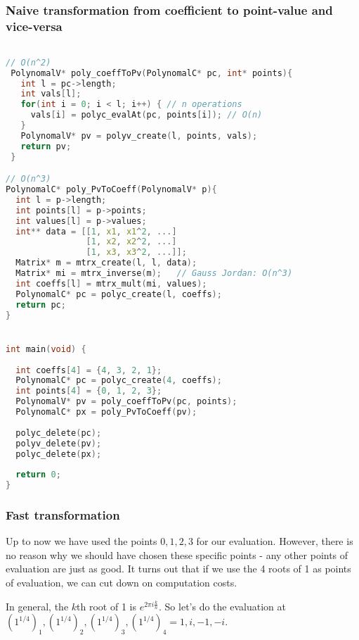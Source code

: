 \subsubsection{Naive transformation from coefficient to point-value and vice-versa}
\begin{lstlisting}[language=c]

// O(n^2)
 PolynomalV* poly_coeffToPv(PolynomalC* pc, int* points){
   int l = pc->length;
   int vals[l];
   for(int i = 0; i < l; i++) { // n operations
     vals[i] = polyc_evalAt(pc, points[i]); // O(n)
   }
   PolynomalV* pv = polyv_create(l, points, vals);
   return pv;
 }

// O(n^3)
PolynomalC* poly_PvToCoeff(PolynomalV* p){
  int l = p->length;
  int points[l] = p->points;
  int values[l] = p->values;
  int** data = [[1, x1, x1^2, ...]
                [1, x2, x2^2, ...]
                [1, x3, x3^2, ...]];
  Matrix* m = mtrx_create(l, l, data);
  Matrix* mi = mtrx_inverse(m);   // Gauss Jordan: O(n^3)
  int coeffs[l] = mtrx_mult(mi, values);
  PolynomalC* pc = polyc_create(l, coeffs);
  return pc;
}


int main(void) {
  
  int coeffs[4] = {4, 3, 2, 1};
  PolynomalC* pc = polyc_create(4, coeffs);
  int points[4] = {0, 1, 2, 3};
  PolynomalV* pv = poly_coeffToPv(pc, points);
  PolynomalC* px = poly_PvToCoeff(pv);
  
  polyc_delete(pc);
  polyv_delete(pv);
  polyc_delete(px);
  
  return 0;
}
\end{lstlisting}

\subsubsection{Fast transformation}
Up to now we have used the points $0, 1, 2, 3$ for our evaluation. However, there is no reason why we should have chosen these specific points - any other points of evaluation are just as good. It turns out that if we use the 4 roots of 1 as points of evaluation, we can cut down on computation costs.

In general, the $k$th root of 1 is $e^{2 \pi i \frac{k}{n} }$. So let's do the evaluation at $(1^{1/4})_1, (1^{1/4})_2, (1^{1/4})_3, (1^{1/4})_4 = 1, i, -1, -i$.

